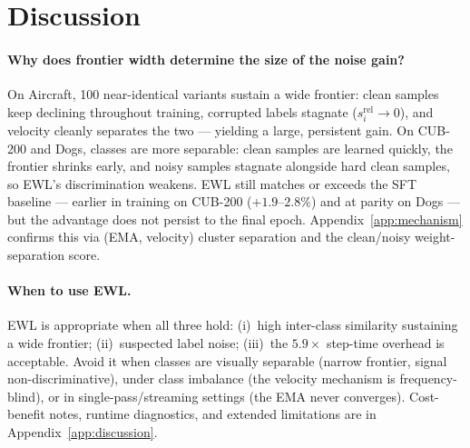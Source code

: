 \section{Discussion}
\label{sec:discussion}
\vspace{-0.5em}
\paragraph{Why does frontier width determine the size of the noise gain?}
On Aircraft, 100 near-identical variants sustain a wide frontier: clean
samples keep declining throughout training, corrupted labels stagnate
($s_i^{\text{rel}} \to 0$), and velocity cleanly separates the two ---
yielding a large, persistent gain.
On CUB-200 and Dogs, classes are more separable: clean samples are learned
quickly, the frontier shrinks early, and noisy samples stagnate alongside
hard clean samples, so EWL's discrimination weakens.
EWL still matches or exceeds the SFT baseline --- earlier in training on
CUB-200 ($+1.9$--$2.8\%$) and at parity on Dogs --- but the advantage does
not persist to the final epoch.
Appendix~\ref{app:mechanism} confirms this via (EMA, velocity) cluster
separation and the clean/noisy weight-separation score.
\vspace{-0.75em}
\paragraph{When to use EWL.}
EWL is appropriate when all three hold: (i)~high inter-class similarity
sustaining a wide frontier; (ii)~suspected label noise; (iii)~the $5.9\times$
step-time overhead is acceptable.
Avoid it when classes are visually separable (narrow frontier, signal
non-discriminative), under class imbalance (the velocity mechanism is
frequency-blind), or in single-pass/streaming settings (the EMA never
converges).
Cost-benefit notes, runtime diagnostics, and extended limitations are in
Appendix~\ref{app:discussion}.
